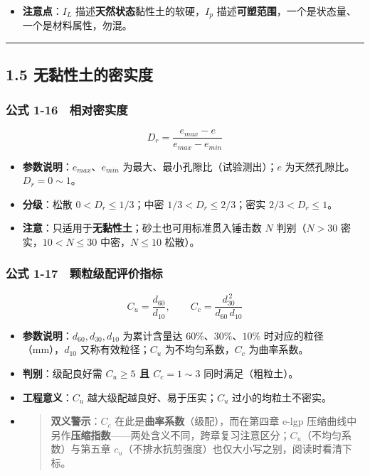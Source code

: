 \documentclass[
]{article}
\providecommand{\tightlist}{%
  \setlength{\itemsep}{0pt}\setlength{\parskip}{0pt}}
\begin{document}
\begin{itemize}
\tightlist
\item
  \textbf{注意点}：\(I_L\) 描述\textbf{天然状态}黏性土的软硬，\(I_p\)
  描述\textbf{可塑范围}，一个是状态量、一个是材料属性，勿混。
\end{itemize}

\begin{center}\rule{0.5\linewidth}{0.5pt}\end{center}

\subsection{1.5
无黏性土的密实度}\label{ux65e0ux9ecfux6027ux571fux7684ux5bc6ux5b9eux5ea6}

\subsubsection{公式
1-16　相对密实度}\label{ux516cux5f0f-1-16-ux76f8ux5bf9ux5bc6ux5b9eux5ea6}

\[D_r=\frac{e_{max}-e}{e_{max}-e_{min}}\]

\begin{itemize}
\tightlist
\item
  \textbf{参数说明}：\(e_{max}\)、\(e_{min}\)
  为最大、最小孔隙比（试验测出）；\(e\) 为天然孔隙比。\(D_r=0\sim1\)。
\item
  \textbf{分级}：松散 \(0<D_r\le1/3\)；中密 \(1/3<D_r\le2/3\)；密实
  \(2/3<D_r\le1\)。
\item
  \textbf{注意}：只适用于\textbf{无黏性土}；砂土也可用标准贯入锤击数
  \(N\) 判别（\(N>30\) 密实，\(10<N\le30\) 中密，\(N\le10\) 松散）。
\end{itemize}

\subsubsection{公式
1-17　颗粒级配评价指标}\label{ux516cux5f0f-1-17-ux9897ux7c92ux7ea7ux914dux8bc4ux4ef7ux6307ux6807}

\[C_u=\frac{d_{60}}{d_{10}},\qquad C_c=\frac{d_{30}^{\,2}}{d_{60}\,d_{10}}\]

\begin{itemize}
\item
  \textbf{参数说明}：\(d_{60},d_{30},d_{10}\) 为累计含量达
  \(60\%、30\%、10\%\) 时对应的粒径（mm），\(d_{10}\)
  又称有效粒径；\(C_u\) 为不均匀系数，\(C_c\) 为曲率系数。
\item
  \textbf{判别}：级配良好需 \textbf{\(C_u\ge5\) 且 \(C_c=1\sim3\)}
  同时满足（粗粒土）。
\item
  \textbf{工程意义}：\(C_u\) 越大级配越良好、易于压实；\(C_u\)
  过小的均粒土不密实。
\item
  \begin{quote}
  \textbf{双义警示}：\(C_c\) 在此是\textbf{曲率系数}（级配），而在第四章
  e-lgp
  压缩曲线中另作\textbf{压缩指数}------两处含义不同，跨章复习注意区分；\(C_u\)（不均匀系数）与第五章
  \(c_u\)（不排水抗剪强度）也仅大小写之别，阅读时看清下标。
  \end{quote}
\end{itemize}
\end{document}
